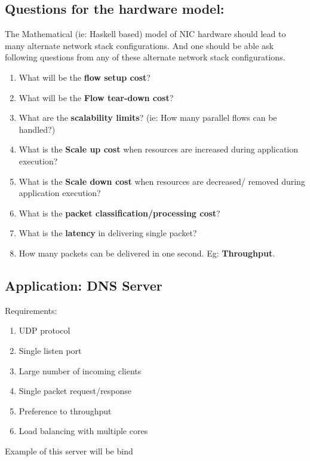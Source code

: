 
\subsection{Questions for the hardware model:}
The Mathematical (ie: Haskell based) model of NIC hardware should lead to
many alternate network stack configurations.  And one should be able ask
following questions from any of these alternate network stack configurations.

\begin{enumerate}
     \item What will be the \textbf{flow setup cost}?
     \item What will be the \textbf{Flow tear-down cost}?
     \item What are the \textbf{scalability limits}? (ie: How many parallel
        flows can be handled?)
     \item What is the \textbf{Scale up cost} when resources are increased
        during application execution?
     \item What is the \textbf{Scale down cost} when resources are decreased/
        removed during application execution?
     \item What is the \textbf{packet classification/processing cost}?
     \item What is the \textbf{latency} in delivering single packet?
     \item How many packets can be delivered in one second.
            Eg: \textbf{Throughput}.
\end{enumerate}


\subsection{Application: DNS Server}
Requirements:
\begin{enumerate}
    \item UDP protocol
    \item Single listen port
    \item Large number of incoming clients
    \item Single packet request/response
    \item Preference to throughput
    \item Load balancing with multiple cores
\end{enumerate}
Example of this server will be bind
